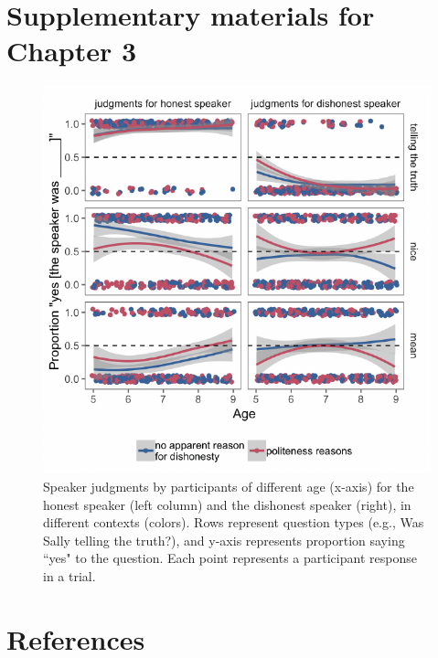 \documentclass[oneside]{report}
\begin{document}
\chapter{Supplementary materials for Chapter
3}\label{supplementary-materials-for-chapter-3}
\begin{figure}[p]

{\centering \includegraphics[width=0.9\linewidth]{erica_yoon_dissertation_files/figure-latex/figTrupolAppendix-1} 

}

\caption[Speaker ratings for the experiment in Chapter 4 with age as a continuous variable.]{Speaker judgments by participants of different age (x-axis) for the honest speaker (left column) and the dishonest speaker (right), in different contexts (colors). Rows represent question types (e.g., Was Sally telling the truth?), and y-axis represents proportion saying ``yes" to the question. Each point represents a participant response in a trial.}\label{fig:figTrupolAppendix}
\end{figure}
\chapter*{References}\label{references}


\noindent

\setlength{\parindent}{-0.20in} \setlength{\leftskip}{0.20in}
\setlength{\parskip}{8pt}
\end{document}
